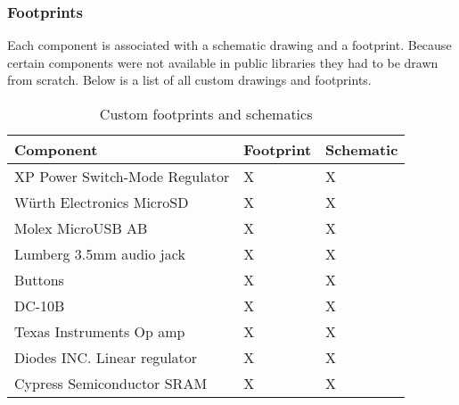 \subsubsection{Footprints}

Each component is associated with a schematic drawing and a footprint. Because certain components were not available in public libraries they had to be drawn from scratch. Below is a list of all custom drawings and footprints.

\begin{table}[H]
	\centering
	\begin{tabular}{|l l l|}
		\hline
		\textbf{Component} & \textbf{Footprint}  & \textbf{Schematic} \\
		\hline
		XP Power Switch-Mode Regulator & X & X \\
		Würth Electronics MicroSD & X & X \\
		Molex MicroUSB AB & X & X \\
		Lumberg 3.5mm audio jack & X & X \\
		Buttons & X & X \\
		DC-10B & X & X \\
		Texas Instruments Op amp & X & X \\
		Diodes INC. Linear regulator& X & X \\
		Cypress Semiconductor SRAM & X & X \\
		\hline
	\end{tabular}
	\caption{Custom footprints and schematics}
	\label{tab:footprints}
\end{table}

